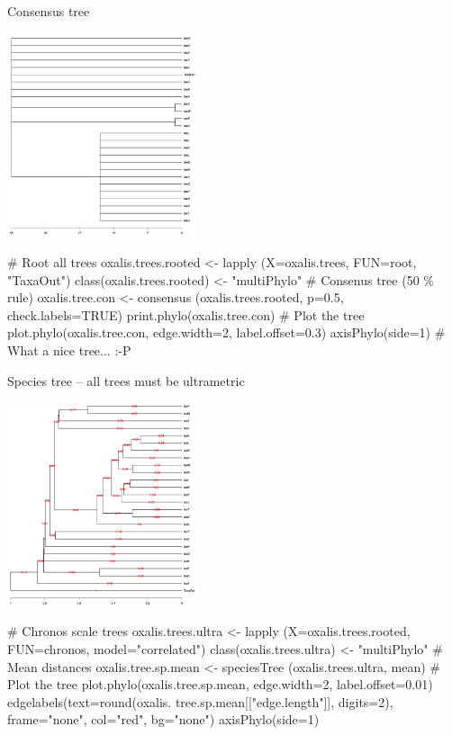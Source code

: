 \documentclass[compress, ucs, xelatex, 11pt, xcolor=svgnames,
  hyperref={
    bookmarks=true,
    unicode=true,
    colorlinks=true,
    pdftitle={Molecular data in R},
    plainpages=false,
    pdfauthor={Vojtech Zeisek},
    pdfsubject={Course about phylogeny and evolution in R},
    pdfcreator={XeLaTeX},
    pdfkeywords={R, evolution, phylogeny, molecular data},
    linkcolor=Tomato,
    anchorcolor=SaddleBrown,
    citecolor=Goldenrod,
    filecolor=DarkMagenta,
    menucolor=Sienna,
    urlcolor=DarkTurquoise,
    pdftex},
  url={hyphens, lowtilde} %
  ]{beamer}
\begin{document}
\begin{frame}[fragile]{Consensus tree}
\begin{multicols}{2}
  \includegraphics[height=6cm]{oxalis-cons.png}
  \begin{spluscode}
    # Root all trees
    oxalis.trees.rooted <- lapply
      (X=oxalis.trees, FUN=root,
      "TaxaOut")
    class(oxalis.trees.rooted) <-
      "multiPhylo"
    # Consenus tree (50 \% rule)
    oxalis.tree.con <- consensus
      (oxalis.trees.rooted, p=0.5,
      check.labels=TRUE)
    print.phylo(oxalis.tree.con)
    # Plot the tree
    plot.phylo(oxalis.tree.con,
      edge.width=2, label.offset=0.3)
    axisPhylo(side=1)
    # What a nice tree... :-P
  \end{spluscode}
\end{multicols}
\end{frame}

\begin{frame}[fragile]{Species tree -- all trees must be ultrametric}
\begin{multicols}{2}
\includegraphics[height=6cm]{oxalis-sp.png}
  \columnbreak
  \begin{spluscode}
    # Chronos scale trees
    oxalis.trees.ultra <- lapply
      (X=oxalis.trees.rooted,
      FUN=chronos, model="correlated")
    class(oxalis.trees.ultra) <-
      "multiPhylo"
    # Mean distances
    oxalis.tree.sp.mean <- speciesTree
      (oxalis.trees.ultra, mean)
    # Plot the tree
    plot.phylo(oxalis.tree.sp.mean,
      edge.width=2, label.offset=0.01)
    edgelabels(text=round(oxalis.
      tree.sp.mean[["edge.length"]],
      digits=2), frame="none",
      col="red", bg="none")
    axisPhylo(side=1)
  \end{spluscode}
\end{multicols}
\end{frame}
\end{document}
